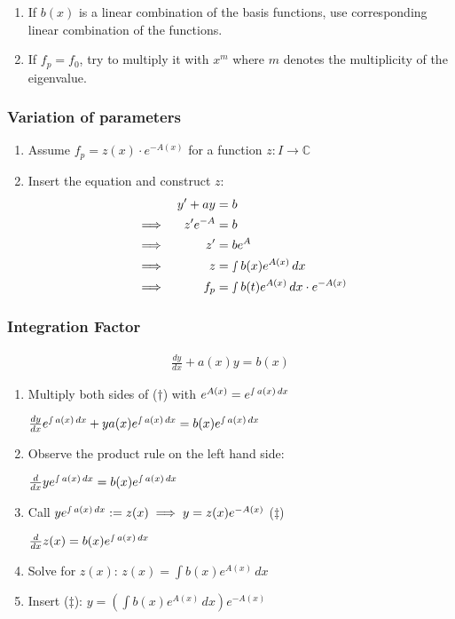 \documentclass[a4paper, 10pt]{article}
\theoremstyle{definition}
\newcommand{\C}{\mathbb{C}}
\begin{document}
\begin{enumerate}
    \item If \(b(x)\) is a linear combination of the basis functions, use corresponding linear combination of the functions.
    \item If \(f_p = f_0\), try to multiply it with \(x^m\) where \(m\) denotes the multiplicity of the eigenvalue.
\end{enumerate}

\subsubsection*{Variation of parameters}
\begin{enumerate}
    \item Assume \(f_p = z(x) \cdot e^{-A(x)}\) for a function \(z: I \to \C\)
    \item Insert the equation and construct \(z\):
    \begin{align*}
        &&y' + ay &= b \\
        &\implies& z'e^{-A} &= b \\
        &\implies& z' &= be^{A} \\
        &\implies& z &= \smallint b(x)e^{A(x)}\,dx \\
        &\implies& f_p &= \smallint b(t) e^{A(x)}\,dx \cdot e^{-A(x)}
    \end{align*}
\end{enumerate}

\subsubsection*{Integration Factor}
\begin{align}
    \tag{\(\dagger\)} \frac{dy}{dx} + a(x) y = b(x)
\end{align}
\begin{enumerate}
    \item Multiply both sides of (\(\dagger\)) with \(e^{A(x)} = e^{\smallint a(x)\,dx}\) \par
    \centering
    \(\frac{dy}{dx} e^{\smallint a(x)\,dx} + ya(x)e^{\smallint a(x)\,dx} = b(x)e^{\smallint a(x)\,dx}\)
    \item \raggedright Observe the product rule on the left hand side: \par
    \centering
    \(\frac{d}{dx}ye^{\smallint a(x)\,dx} = b(x)e^{\smallint a(x)\,dx}\)
    \item \raggedright Call \(y e^{\smallint a(x)\,dx}:=z(x) \implies y = z(x)e^{-A(x)}\) (\(\ddagger\)) \par
    \centering
    \(\frac{d}{dx}z(x) = b(x)e^{\smallint a(x)\,dx}\)
    \item \raggedright Solve for \(z(x)\): \(z(x) = \int b(x) e^{A(x)}\,dx\)
    \item \raggedright Insert (\(\ddagger\)):
    \(y = \left(\int b(x)e^{A(x)} \,dx\right) e^{-A(x)}\)
\end{enumerate}
\end{document}
